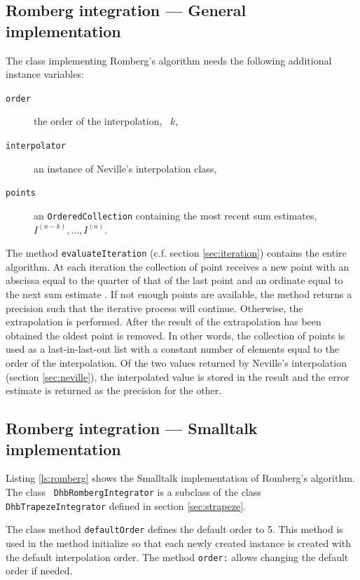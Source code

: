 \documentclass[twoside]{book}
\begin{document}
\subsection{Romberg integration --- General implementation}
The class implementing Romberg's algorithm needs the following
additional instance variables:
\begin{description}
\item[\tt order]the order of the interpolation, \ie\ $k$,\\
\item[\tt interpolator ]an instance of Neville's interpolation class,\\
\item[\tt points]an {\tt OrderedCollection} containing the most recent sum estimates,
\ie\ $I^{\left(n-k\right)},\ldots,I^{\left(n\right)}$.\\
\end{description}
The method {\tt evaluateIteration} (c.f. section
\ref{sec:iteration}) contains the entire algorithm. At each
iteration the collection of point receives a new point with an
abscissa equal to the quarter of that of the last point and an
ordinate equal to the next sum estimate . If not enough points are
available, the method returns a precision such that the iterative
process will continue. Otherwise, the extrapolation is performed.
After the result of the extrapolation has been obtained the oldest
point is removed. In other words, the collection of points is used
as a last-in-last-out list with a constant number of elements
equal to the order of the interpolation. Of the two values
returned by Neville's interpolation (\cf section
\ref{sec:neville}), the interpolated value is stored in the result
and the error estimate is returned as the precision for the other.

\subsection{Romberg integration --- Smalltalk implementation}
\label{sec:sromberg} Listing \ref{ls:romberg} shows the Smalltalk
implementation of Romberg's algorithm. The class {\tt
DhbRombergIntegrator} is a subclass of the class {\tt
DhbTrapezeIntegrator} defined in section \ref{sec:strapeze}.

The class method {\tt defaultOrder} defines the default order to
5. This method is used in the method initialize so that each newly
created instance is created with the default interpolation order.
The method {\tt order:} allows changing the default order if
needed.
\end{document}
